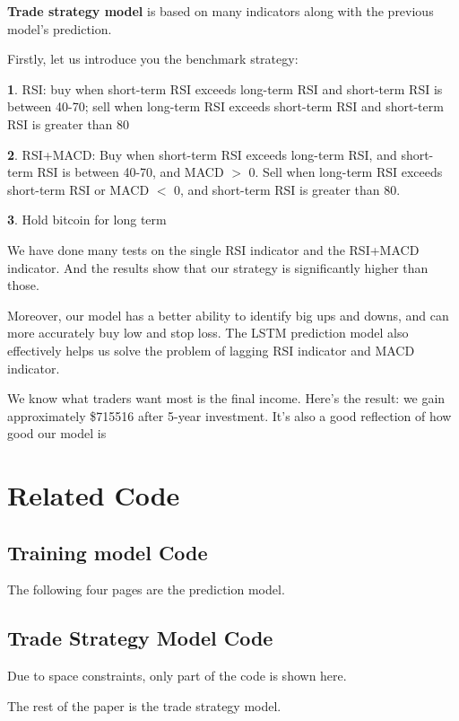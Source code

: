 \documentclass[12pt]{article}
\begin{document}
\begin{appendices}
        \textbf{Trade strategy model} is based on many indicators along with the previous model's prediction.
        
        Firstly, let us introduce you the benchmark strategy:
        
        \noindent\textbf{1}. RSI: buy when short-term RSI exceeds long-term RSI and short-term RSI is between 40-70; sell when long-term RSI exceeds short-term RSI and short-term RSI is greater than 80
    
        \noindent\textbf{2}. RSI+MACD: Buy when short-term RSI exceeds long-term RSI, and short-term RSI is between 40-70, and MACD $>$ 0. Sell when long-term RSI exceeds short-term RSI or MACD $<$ 0, and short-term RSI is greater than 80.
    
        \noindent\textbf{3}. Hold bitcoin for long term
        
        We have done many tests on the single RSI indicator and the RSI+MACD indicator.
        And the results show that our strategy is significantly higher than those.
        
        Moreover, our model has a better ability to identify big ups and downs, and can more accurately buy low and stop loss. 
        The LSTM prediction model also effectively helps us solve the problem of lagging RSI indicator and MACD indicator.
        
        We know what traders want most is the final income.
        Here's the result: we gain approximately \$715516 after 5-year investment.
        It's also a good reflection of how good our model is


        \section{Related Code}
        
        \subsection{Training model Code}
        The following \textcolor[rgb]{1,0,0}{four pages} are the prediction model.
        
        
        \subsection{Trade Strategy Model Code}
        Due to space constraints, only part of the code is shown here.
        
        The rest of the paper is the trade strategy model.
        
        

    \end{appendices}
\end{document}
